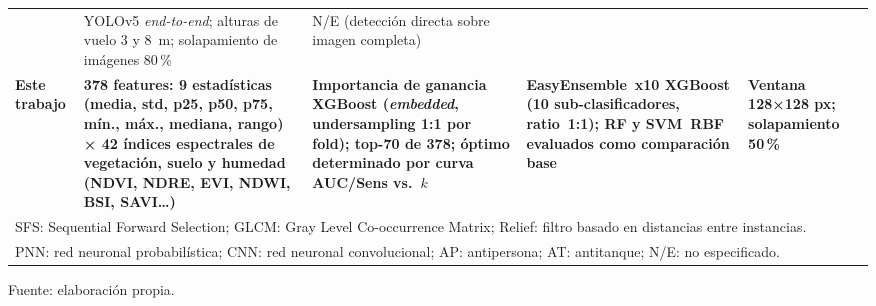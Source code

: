 \begin{landscape}
\begin{table}
\begin{tabularx}{\linewidth}{p{1.8cm} X X X p{2.5cm}}
  & YOLOv5 \textit{end-to-end}; alturas de vuelo 3 y 8~m;
    solapamiento de imágenes 80\,\%
  & N/E (detección directa sobre imagen completa) \\
\addlinespace
\textbf{Este trabajo}
  & \textbf{378 features: 9 estadísticas (media, std, p25, p50, p75,
    mín., máx., mediana, rango) × 42 índices espectrales de
    vegetación, suelo y humedad (NDVI, NDRE, EVI, NDWI, BSI, SAVI\ldots)}
  & \textbf{Importancia de ganancia XGBoost (\textit{embedded}, undersampling 1:1 por fold);
    top-70 de 378; óptimo determinado por curva AUC/Sens vs.\ $k$}
  & \textbf{EasyEnsemble~x10 XGBoost (10 sub-clasificadores, ratio~1:1);
    RF y SVM~RBF evaluados como comparación base}
  & \textbf{Ventana 128×128 px; solapamiento 50\,\%} \\
\bottomrule
\multicolumn{5}{l}{\small SFS: Sequential Forward Selection; GLCM: Gray Level Co-occurrence Matrix;
Relief: filtro basado en distancias entre instancias.} \\
\multicolumn{5}{l}{\small PNN: red neuronal probabilística; CNN: red neuronal convolucional;
AP: antipersona; AT: antitanque; N/E: no especificado.}
\end{tabularx}

  {\footnotesize Fuente: elaboración propia.}
\end{table}
\end{landscape}
\clearpage



